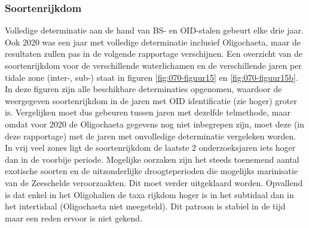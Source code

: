 \documentclass[twoside]{extreport}
\begin{document}
\hypertarget{soortenrijkdom}{%
\subsubsection{Soortenrijkdom}\label{soortenrijkdom}}

Volledige determinatie aan de hand van BS- en OID-stalen gebeurt elke
drie jaar. Ook 2020 was een jaar met volledige determinatie inclusief
Oligochaeta, maar de resultaten zullen pas in de volgende rapportage
verschijnen. Een overzicht van de soortenrijkdom voor de verschillende
waterlichamen en de verschillende jaren per tidale zone (inter-, sub-)
staat in figuren \ref{fig:070-figuur15} en \ref{fig:070-figuur15b}. In
deze figuren zijn alle beschikbare determinaties opgenomen, waardoor de
weergegeven soortenrijkdom in de jaren met OID identificatie (zie hoger)
groter is. Vergelijken moet dus gebeuren tussen jaren met dezelfde
telmethode, maar omdat voor 2020 de Oligochaeta gegevens nog niet
inbegrepen zijn, moet deze (in deze rapportage) met de jaren met
onvolledige determinatie vergeleken worden. In vrij veel zones ligt de
soortenrijkdom de laatste 2 onderzoeksjaren iets hoger dan in de
voorbije periode. Mogelijke oorzaken zijn het steeds toenemend aantal
exotische soorten en de uitzonderlijke droogteperioden die mogelijks
marinisatie van de Zeeschelde veroorzaakten. Dit moet verder uitgeklaard
worden. Opvallend is dat enkel in het Oligohalien de taxa rijkdom hoger
is in het subtidaal dan in het intertidaal (Oligochaeta niet meegeteld).
Dit patroon is stabiel in de tijd maar een reden ervoor is niet gekend.
\end{document}
